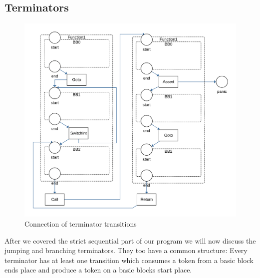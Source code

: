 \subsection{Terminators}
\begin{figure}
    \centering
    \includegraphics[width=.9\textwidth]{../diagrams/TerminatorsNet.png}
    \caption{Connection of terminator transitions}
    \label{terminators_net}
\end{figure}
After we covered the strict sequential part of our program we will now discuss the jumping and branching terminators.
They too have a common structure:
Every terminator has at least one transition which consumes a token from a basic block ends place and produce a token on a basic blocks start place.

